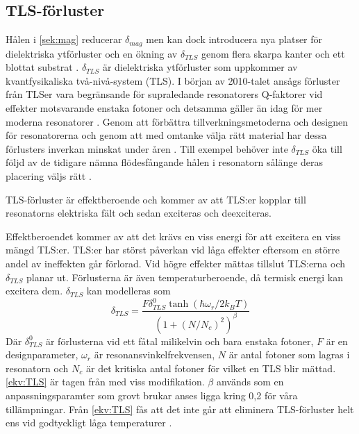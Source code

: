\documentclass[main.tex]{subfiles}
\begin{document}
\subsection{TLS-förluster}

\label{sec:tls}
Hålen i \ref{sek:mag} reducerar $\delta_{mag}$ men kan dock introducera nya platser för dielektriska ytförluster och en ökning av $\delta_{TLS}$ genom flera skarpa kanter och ett blottat substrat \cite{Chiaro2016}. $\delta_{TLS}$ är dielektriska ytförluster som uppkommer av kvantfysikaliska två-nivå-system (TLS). I början av 2010-talet ansågs förluster från TLSer vara begränsande för supraledande resonatorers Q-faktorer vid effekter motsvarande enstaka fotoner \cite{Siddiqi2011} och detsamma gäller än idag för mer moderna resonatorer \cite{Boehme2016}\cite{Goetz2016}. Genom att förbättra tillverkningsmetoderna och designen för resonatorerna och genom att med omtanke välja rätt material har dessa förlusters inverkan minskat under åren \cite{Oliver2013}. Till exempel behöver inte $\delta_{TLS}$ öka till följd av de tidigare nämna flödesfångande hålen i resonatorn sålänge deras placering väljs rätt \cite{Chiaro2016}.

TLS-förluster är effektberoende och kommer av att TLS:er kopplar till resonatorns elektriska fält och sedan exciteras och deexciteras\cite{Boehme2016,Goetz2016}. 

Effektberoendet kommer av att det krävs en viss energi för att excitera en viss mängd TLS:er. TLS:er har störst påverkan vid låga effekter eftersom en större andel av ineffekten går förlorad. Vid högre effekter mättas tillslut TLS:erna och $\delta_{TLS}$ planar ut. Förlusterna är även temperaturberoende, då termisk energi kan excitera dem. $\delta_{TLS}$ kan modelleras som
\begin{equation}
    \delta_{TLS}=\frac{F\delta_{TLS}^0\tanh{(\hbar\omega_r/2k_BT)}}{(1+(N/N_c)^2)^\beta}
    \label{ekv:TLS}
\end{equation}
Där $\delta_{TLS}^0$ är förlusterna vid ett fåtal milikelvin och bara enstaka fotoner, $F$ är en designparameter, $\omega_r$ är resonansvinkelfrekvensen, $N$ är antal fotoner som lagras i resonatorn och $N_c$ är det kritiska antal fotoner för vilket en TLS blir mättad. \eqref{ekv:TLS} är tagen från \cite{pappas2011two} med viss modifikation. $\beta$ används som en anpassningsparamter som grovt brukar anses ligga kring 0,2 \cite{faoro2012} för våra tillämpningar. Från \eqref{ekv:TLS} fås att det inte går att eliminera TLS-förluster helt ens vid godtyckligt låga temperaturer \cite{Boehme2016}.
\end{document}
